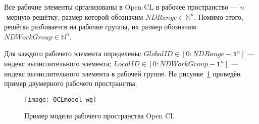 

Все рабочие элементы организованы в Open CL в рабочее пространство ---
$n$-мерную решётку,  
размер которой обозначим $NDRange \in \mathbb {N}^n$.
Помимо этого, %
решётка разбивается на %
рабочие группы, %
их размер обозначим $NDWorkGroup \in \mathbb {N}^n$. 

Для каждого рабочего элемента %
определены:  
$GlobalID \in [0: NDRange - \mathbf{1}^n]$ %
--- индекс вычислительного элемента; %
$LocalID \in [0: NDWorkGroup - \mathbf{1}^n]$ ---
индекс вычислительного элемента в рабочей группе.
На рисунке~\ref{fig:OCL_wg} приведён пример
двумерного рабочего пространства.


\begin{figure}[h!]
  \centering
  \texttt{[image: OCLmodel\_wg]} 
  \caption{Пример модели рабочего пространства Open CL}
  \label{fig:OCL_wg}
\end{figure}
\FloatBarrier





